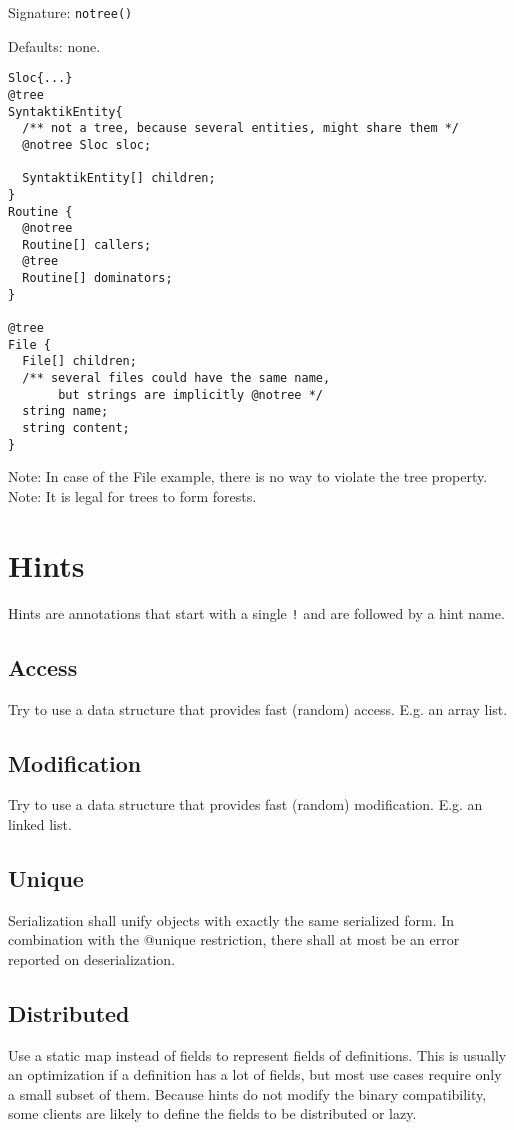 \documentclass[a4paper,10pt]{article}
\begin{document}
Signature: \verb/notree()/

Defaults: none.

\begin{lstlisting}[label=treeExample,caption=Examples,language=skill]
Sloc{...}
@tree
SyntaktikEntity{
  /** not a tree, because several entities, might share them */
  @notree Sloc sloc;
  
  SyntaktikEntity[] children;
}
Routine {
  @notree
  Routine[] callers;
  @tree
  Routine[] dominators;
}

@tree
File {
  File[] children;
  /** several files could have the same name,
       but strings are implicitly @notree */
  string name;
  string content;
} 
\end{lstlisting}
Note: In case of the File example, there is no way to violate the tree property.
Note: It is legal for trees to form forests.


\section{Hints}
\label{hints}

Hints are annotations that start with a single \verb/!/ and are followed by a hint name.

\subsection*{Access}
Try to use a data structure that provides fast (random) access. E.g. an array list.

\subsection*{Modification}
Try to use a data structure that provides fast (random) modification. E.g. an linked list.

\subsection*{Unique}
Serialization shall unify objects with exactly the same serialized form. In combination with the @unique restriction, there shall at most be an error reported on deserialization.

\subsection*{Distributed}
Use a static map instead of fields to represent fields of definitions. This is usually an optimization if a definition has a lot of fields, but most use cases require only a small subset of them. Because hints do not modify the binary compatibility, some clients are likely to define the fields to be distributed or lazy.
\end{document}
